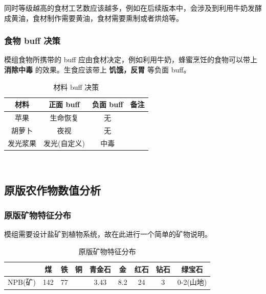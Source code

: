 同时等级越高的食材工艺数应该越多，例如在后续版本中，会涉及到利用牛奶发酵成黄油，食材制作需要黄油，食材需要熏制或者烘焙等。

\subsubsection{食物 buff 决策}

模组食物所携带的 buff 应由食材决定，例如利用牛奶，蜂蜜烹饪的食物可以带上 \textbf{消除中毒} 的效果。生食应该带上 \textbf{饥饿，反胃} 等负面 buff。

\begin{center}
    \setlength{\tabcolsep}{4mm}
    \begin{longtable}{c|c|c|c}
        \caption{材料 buff 决策} \\
        \toprule
        \textbf{材料} & \textbf{正面 buff} & \textbf{负面 buff} & 备注 \\
        \midrule
        苹果 & 生命恢复 & 无 & \\
        胡萝卜 & 夜视 & 无 & \\
        发光浆果 & 发光(自定义) & 中毒 \\
        \bottomrule
    \end{longtable}
\end{center}

\

\subsection{原版农作物数值分析}
\subsubsection{原版矿物特征分布}

模组需要设计盐矿到植物系统，故在此进行一个简单的矿物说明。

\begin{table}[H]
    \centering
    \caption{原版矿物特征分布}
    \label{table:原版矿物特征分布}
    \setlength{\tabcolsep}{4mm}
    \begin{tabular}{c|cccccccc}
        \toprule
        \textbf{} & \textbf{煤} & \textbf{铁} & \textbf{铜} & \textbf{青金石} & \textbf{金} & \textbf{红石} & \textbf{钻石} & \textbf{绿宝石} \\
        \midrule
        NPB(矿) & 142 & 77 &  & 3.43 & 8.2 & 24 & 3 & 0-2(山地) \\
        \bottomrule
    \end{tabular}
\end{table}

